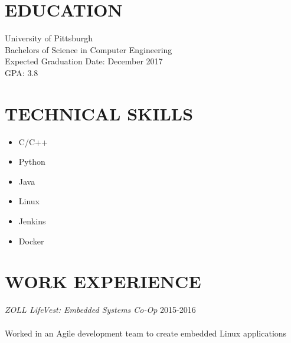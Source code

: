 \documentclass[line, margin]{res}
\begin{document}
\address{3136 Colony Lane \\ Plymouth Meeting, PA 19462 \\ (484) 866-6792}

\begin{resume}

\section{EDUCATION}
University of Pittsburgh \\
Bachelors of Science in Computer Engineering \\
Expected Graduation Date: December 2017 \\
GPA: 3.8

\section{TECHNICAL SKILLS}
\begin{itemize}
	\item C/C++
	\item Python
	\item Java
	\item Linux
	\item Jenkins
	\item Docker
\end{itemize}

\section{WORK EXPERIENCE}
\textit{ZOLL LifeVest: Embedded Systems Co-Op} 	\hfill 2015-2016 \\ \\
Worked in an Agile development team to create embedded Linux applications \\

\end{resume}
\end{document}
